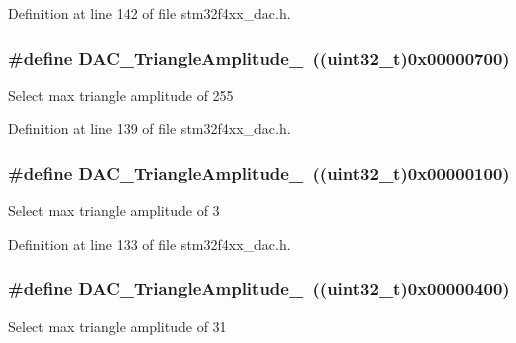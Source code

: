 Definition at line 142 of file stm32f4xx\-\_\-dac.\-h.

\hypertarget{group___d_a_c__lfsrunmask__triangleamplitude_gadb404422c86a7b92d78e6d9617e8ce4d}{
\subsubsection[{D\-A\-C\-\_\-\-Triangle\-Amplitude\-\_\-255}]{\setlength{\rightskip}{0pt plus 5cm}\#define D\-A\-C\-\_\-\-Triangle\-Amplitude\-\_~((uint32\-\_\-t)0x00000700)}}\label{group___d_a_c__lfsrunmask__triangleamplitude_gadb404422c86a7b92d78e6d9617e8ce4d}
Select max triangle amplitude of 255 

Definition at line 139 of file stm32f4xx\-\_\-dac.\-h.

\hypertarget{group___d_a_c__lfsrunmask__triangleamplitude_ga9798d68c3bbf0a57306bf2f962697377}{
\subsubsection[{D\-A\-C\-\_\-\-Triangle\-Amplitude\-\_\-3}]{\setlength{\rightskip}{0pt plus 5cm}\#define D\-A\-C\-\_\-\-Triangle\-Amplitude\-\_~((uint32\-\_\-t)0x00000100)}}\label{group___d_a_c__lfsrunmask__triangleamplitude_ga9798d68c3bbf0a57306bf2f962697377}
Select max triangle amplitude of 3 

Definition at line 133 of file stm32f4xx\-\_\-dac.\-h.

\hypertarget{group___d_a_c__lfsrunmask__triangleamplitude_ga10b15745b749c62a56bd3d7bd5a27e1b}{
\subsubsection[{D\-A\-C\-\_\-\-Triangle\-Amplitude\-\_\-31}]{\setlength{\rightskip}{0pt plus 5cm}\#define D\-A\-C\-\_\-\-Triangle\-Amplitude\-\_~((uint32\-\_\-t)0x00000400)}}\label{group___d_a_c__lfsrunmask__triangleamplitude_ga10b15745b749c62a56bd3d7bd5a27e1b}
Select max triangle amplitude of 31 

